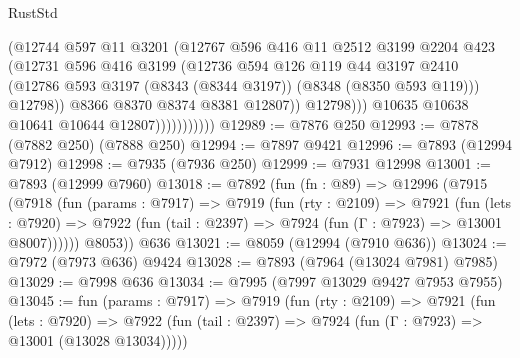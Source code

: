\begin{lexlean}{RustStd}
\begin{coremodule}
{\begin{coremodule}
{{{{{{{{{{{{{{{{{{{{{{{{{{{{{{{{{{{{{{{{{{{{{{{{{{                                (@12744
                                  @597
                                  @11
                                  @3201
                                  (@12767
                                    @596
                                    @416
                                    @11
                                    @2512
                                    @3199
                                    @2204
                                    @423
                                    (@12731
                                      @596
                                      @416
                                      @3199
                                      (@12736
                                        @594
                                        @126
                                        @119
                                        @44
                                        @3197
                                        @2410
                                        (@12786
                                          @593
                                          @3197
                                          (@8343 (@8344 @3197))
                                          (@8348 (@8350 @593 @119)))
                                        @12798))
                                    @8366
                                    @8370
                                    @8374
                                    @8381
                                    @12807))
                                @12798)))
                          @10635
                          @10638
                          @10641
                          @10644
                          @12807)))))))))))
@12989 := @7876 @250
@12993 := @7878 (@7882 @250) (@7888 @250)
@12994 := @7897 @9421
@12996 := @7893 (@12994 @7912)
@12998 := @7935 (@7936 @250)
@12999 := @7931 @12998
@13001 := @7893 (@12999 @7960)
@13018 := @7892
    (fun (fn : @89) =>
    @12996
      (@7915
        (@7918
          (fun (params : @7917) =>
          @7919
            (fun (rty : @2109) =>
            @7921
              (fun (lets : @7920) =>
              @7922 (fun (tail : @2397) => @7924 (fun (Γ : @7923) => @13001 @8007))))))
        @8053))
    @636
@13021 := @8059 (@12994 (@7910 @636))
@13024 := @7972 (@7973 @636) @9424
@13028 := @7893 (@7964 (@13024 @7981) @7985)
@13029 := @7998 @636
@13034 := @7995 (@7997 @13029 @9427 @7953 @7955)
@13045 := fun (params : @7917) =>
  @7919
    (fun (rty : @2109) =>
    @7921
      (fun (lets : @7920) =>
      @7922 (fun (tail : @2397) => @7924 (fun (Γ : @7923) => @13001 (@13028 @13034)))))
}}}}}}}}}}}}}}}}}}}}}}}}}}}}}}}}}}}}}}}}}}}}}}}}}}
\end{coremodule}}
\end{coremodule}
\end{lexlean}
